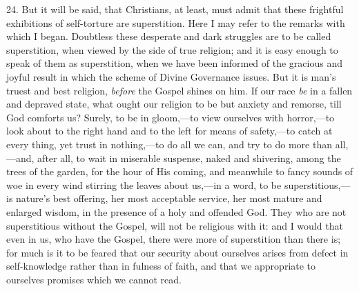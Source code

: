 24. But it will be said, that Christians, at least, must admit that
these frightful exhibitions of self-torture are superstition. Here I
may refer to the remarks with which I began. Doubtless these desperate
and dark struggles are to be called superstition, when viewed by the
side of true religion; and it is easy enough to speak of them as
superstition, when we have been informed of the gracious and joyful
result in which the scheme of Divine Governance issues. But it is
man's truest and best religion, \emph{before} the Gospel shines on
him. If our race \emph{be} in a fallen and depraved state, what ought our
religion to be but anxiety and remorse, till God comforts us? Surely,
to be in gloom,—to view ourselves with horror,—to look about to
the right hand and to the left for means of safety,—to catch at
every thing, yet trust in nothing,—to do all we can, and try to do
more than all,—and, after all, to wait in miserable suspense, naked
and shivering, among the trees of the garden, for the hour of His
coming, and meanwhile to fancy sounds of woe in every wind stirring
the leaves about us,—in a word, to be superstitious,—is nature's
best offering, her most acceptable service, her most mature and
enlarged wisdom, in the presence of a holy and offended God. They who
are not superstitious without the Gospel, will not be religious with
it: and I would that even in us, who have the Gospel, there were more
of superstition than there is; for much is it to be feared that our
security about ourselves arises from defect in self-knowledge rather
than in fulness of faith, and that we appropriate to ourselves
promises which we cannot read.

